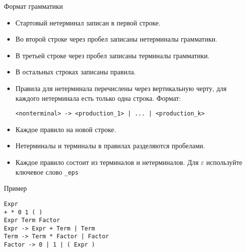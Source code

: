 \documentclass[12pt]{article}
\begin{document}
\begin{center} Формат грамматики \end{center}

\begin{itemize}
    \item Стартовый нетерминал записан в первой строке.
    \item Во второй строке через пробел записаны нетерминалы грамматики.
    \item В третьей строке через пробел записаны терминалы грамматики.
    \item В остальных строках записаны правила.
    \item { Правила для нетерминала перечислены через вертикальную черту, для каждого нетерминала есть только одна строка. Формат:

 \verb!<nonterminal> -> <production_1> | ... | <production_k>! }
    \item Каждое правило на новой строке.
    \item Нетерминалы и терминалы в правилах разделяются пробелами.
    \item Каждое правило состоит из терминалов и нетерминалов. Для $\varepsilon$ используйте ключевое слово \verb!_eps!
\end{itemize}

\begin{center} Пример \end{center}

\begin{verbatim}
Expr
+ * 0 1 ( )
Expr Term Factor
Expr -> Expr + Term | Term 
Term -> Term * Factor | Factor 
Factor -> 0 | 1 | ( Expr )
\end{verbatim}
\end{document}

